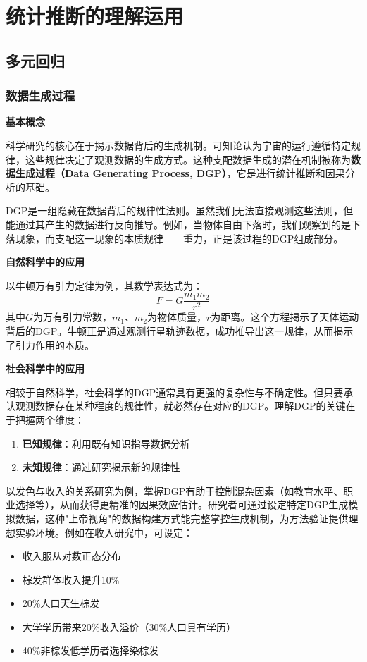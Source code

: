 \chapter{统计推断的理解运用}

\section{多元回归}

\subsection{数据生成过程}

\textbf{基本概念}  

科学研究的核心在于揭示数据背后的生成机制。可知论认为宇宙的运行遵循特定规律，这些规律决定了观测数据的生成方式。这种支配数据生成的潜在机制被称为\textbf{数据生成过程（Data Generating Process, DGP）}，它是进行统计推断和因果分析的基础。

DGP是一组隐藏在数据背后的规律性法则。虽然我们无法直接观测这些法则，但能通过其产生的数据进行反向推导。例如，当物体自由下落时，我们观察到的是下落现象，而支配这一现象的本质规律——重力，正是该过程的DGP组成部分。

\textbf{自然科学中的应用} 

以牛顿万有引力定律为例，其数学表达式为：  
\begin{equation}
    F = G \frac{m_1 m_2}{r^2}
\end{equation}  
其中$G$为万有引力常数，$m_1$、$m_2$为物体质量，$r$为距离。这个方程揭示了天体运动背后的DGP。牛顿正是通过观测行星轨迹数据，成功推导出这一规律，从而揭示了引力作用的本质。

\textbf{社会科学中的应用}  

相较于自然科学，社会科学的DGP通常具有更强的复杂性与不确定性。但只要承认观测数据存在某种程度的规律性，就必然存在对应的DGP。理解DGP的关键在于把握两个维度：  
\begin{enumerate}
    \item \textbf{已知规律}：利用既有知识指导数据分析
    \item \textbf{未知规律}：通过研究揭示新的规律性
\end{enumerate}  

以发色与收入的关系研究为例，掌握DGP有助于控制混杂因素（如教育水平、职业选择等），从而获得更精准的因果效应估计。研究者可通过设定特定DGP生成模拟数据，这种"上帝视角"的数据构建方式能完整掌控生成机制，为方法验证提供理想实验环境。例如在收入研究中，可设定：

\begin{itemize}
    \item 收入服从对数正态分布
    \item 棕发群体收入提升10\%
    \item 20\%人口天生棕发
    \item 大学学历带来20\%收入溢价（30\%人口具有学历）
    \item 40\%非棕发低学历者选择染棕发
\end{itemize}  


